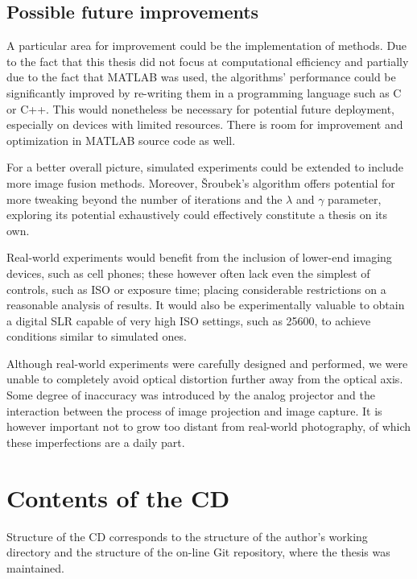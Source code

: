 \documentclass[12pt,notitlepage]{report}
\begin{document}
\section{Possible future improvements}

A particular area for improvement could be the implementation of methods. Due to the fact that this thesis did not focus at computational efficiency and partially due to the fact that MATLAB was used, the algorithms' performance could be significantly improved by re-writing them in a programming language such as C or C++. This would nonetheless be necessary for potential future deployment, especially on devices with limited resources. There is room for improvement and optimization in MATLAB source code as well. 

For a better overall picture, simulated experiments could be extended to include more image fusion methods. Moreover, Šroubek's algorithm offers potential for more tweaking beyond the number of iterations and the $\lambda$ and $\gamma$ parameter, exploring its potential exhaustively could effectively constitute a thesis on its own.

Real-world experiments would benefit from the inclusion of lower-end imaging devices, such as cell phones; these however often lack even the simplest of controls, such as ISO or exposure time; placing considerable restrictions on a reasonable analysis of results. It would also be experimentally valuable to obtain a digital SLR capable of very high ISO settings, such as 25600, to achieve conditions similar to simulated ones. 

Although real-world experiments were carefully designed and performed, we were unable to completely avoid optical distortion further away from the optical axis. Some degree of inaccuracy was introduced by the analog projector and the interaction between the process of image projection and image capture. It is however important not to grow too distant from real-world photography, of which these imperfections are a daily part. 

\appendix

\chapter{Contents of the CD}

Structure of the CD corresponds to the structure of the author's working directory and the structure of the on-line Git repository, where the thesis was maintained. 
\end{document}
